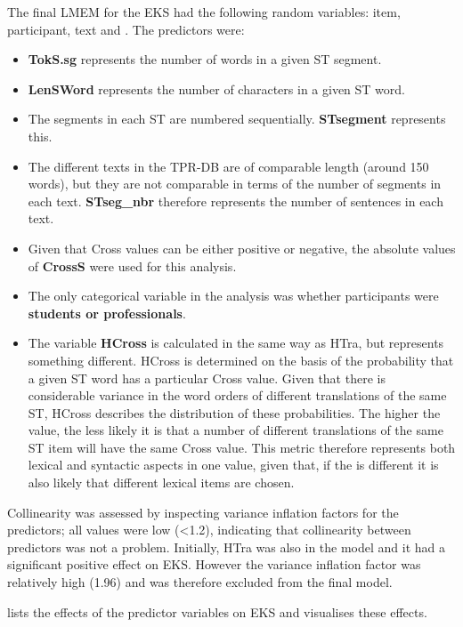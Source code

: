 \documentclass[output=paper]{LSP/langsci}
\begin{document}
The final LMEM for the EKS had the following random variables: item, participant, text and . The predictors were:

\begin{itemize}
\item \textbf{TokS.sg} represents the number of words in a given ST segment.
\item \textbf{LenSWord} represents the number of characters in a given ST word.
\item The segments in each ST are numbered sequentially. \textbf{STsegment} represents this.
\item The different texts in the TPR-DB are of comparable length (around 150 words), but they are not comparable in terms of the number of segments in each text. \textbf{STseg\_nbr} therefore represents the number of sentences in each text.
\item Given that Cross values can be either positive or negative, the absolute values of \textbf{CrossS} were used for this analysis.
\item The only categorical variable in the analysis was whether participants were \textbf{students or professionals}.
\item The variable \textbf{HCross} is calculated in the same way as HTra, but represents something different. HCross is determined on the basis of the probability that a given ST word has a particular Cross value. Given that there is considerable variance in the word orders of different translations of the same ST, HCross describes the distribution of these probabilities. The higher the value, the less likely it is that a number of different translations of the same ST item will have the same Cross value. This metric therefore represents both lexical and syntactic aspects in one value, given that, if the  is different it is also likely that different lexical items are chosen.
\end{itemize}

Collinearity was assessed by inspecting variance inflation factors for the predictors; all values were low (<1.2), indicating that collinearity between predictors was not a problem. Initially, HTra was also in the model and it had a significant positive effect on EKS. However the variance inflation factor was relatively high (1.96) and was therefore excluded from the final model.

 lists the effects of the predictor variables on EKS and  visualises these effects.
\end{document}
